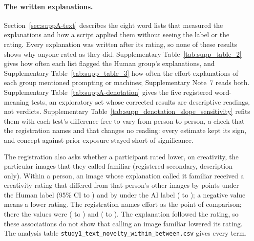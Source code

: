 

\paragraph*{The written explanations.}
Section~\ref{sec:suppA-text} describes the eight word lists that measured the explanations and how a script applied them without seeing the label or the rating. Every explanation was written after its rating, so none of these results shows why anyone rated as they did. Supplementary Table~\ref{tab:supp_table_2} gives how often each list flagged the Human group's explanations, and Supplementary Table~\ref{tab:supp_table_3} how often the effort explanations of each group mentioned prompting or machines; Supplementary Note~7 reads both. Supplementary Table~\ref{tab:suppA-denotation} gives the five registered word-meaning tests, an exploratory set whose corrected results are descriptive readings, not verdicts. Supplementary Table~\ref{tab:supp_denotation_slope_sensitivity} refits them with each test's difference free to vary from person to person, a check that the registration names and that changes no reading: every estimate kept its sign, and concept against prior exposure stayed short of significance.






The registration also asks whether a participant rated lower, on creativity, the particular images that they called familiar (registered secondary, description only). Within a person, an image whose explanation called it familiar received a creativity rating that differed from that person's other images by \SOneFamiliarCreatHumanEst{} points under the Human label (95\% CI \SOneFamiliarCreatHumanLo{} to \SOneFamiliarCreatHumanHi) and by \SOneFamiliarCreatAIEst{} under the AI label (\SOneFamiliarCreatAILo{} to \SOneFamiliarCreatAIHi); a negative value means a lower rating. The registration names effort as the point of comparison; there the values were \SOneFamiliarEffHumanEst{} (\SOneFamiliarEffHumanLo{} to \SOneFamiliarEffHumanHi) and \SOneFamiliarEffAIEst{} (\SOneFamiliarEffAILo{} to \SOneFamiliarEffAIHi). The explanation followed the rating, so these associations do not show that calling an image familiar lowered its rating. The analysis table \nolinkurl{study1_text_novelty_within_between.csv} gives every term.

